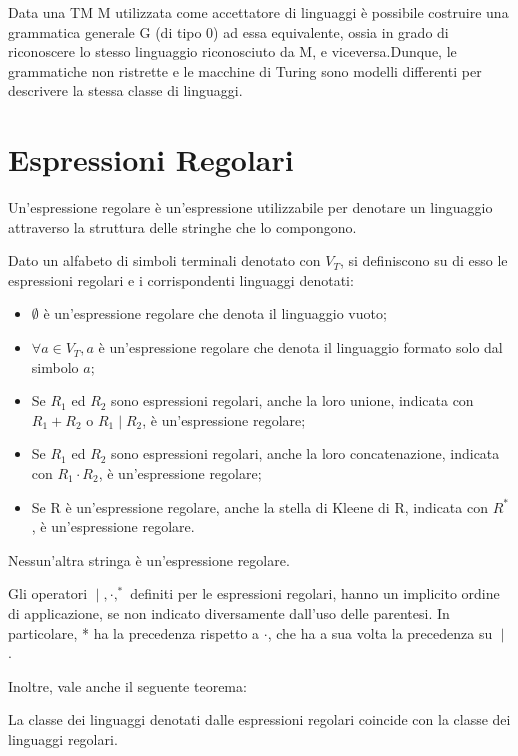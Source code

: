   \begin{theorem}
    Data una TM M utilizzata come accettatore di linguaggi è possibile costruire una grammatica generale G (di tipo 0) ad essa equivalente, ossia in grado di riconoscere lo stesso linguaggio riconosciuto da M, e viceversa.Dunque, le grammatiche non ristrette e le macchine di Turing sono modelli differenti per descrivere la stessa classe di linguaggi.
  \end{theorem}

  \section{Espressioni Regolari}
  Un'espressione regolare è un'espressione utilizzabile per denotare un linguaggio attraverso la struttura delle stringhe che lo compongono.

  \begin{definition}
    Dato un alfabeto di simboli terminali denotato con \(V_T\), si definiscono su di esso le espressioni regolari e i corrispondenti linguaggi denotati:
    \begin{itemize}
      \item \(\emptyset\) è un'espressione regolare che denota il linguaggio vuoto;
      \item \(\forall a\in V_T, a\) è un'espressione regolare che denota il linguaggio formato solo dal simbolo \(a\);
      \item Se \(R_1\) ed \(R_2\) sono espressioni regolari, anche la loro unione, indicata con \(R_1+R_2\) o \(R_1\;|\;R_2\), è un'espressione regolare;
      \item Se \(R_1\) ed \(R_2\) sono espressioni regolari, anche la loro concatenazione, indicata con \(R_1\cdot R_2\), è un'espressione regolare;
      \item Se R è un'espressione regolare, anche la stella di Kleene di R, indicata con \(R^*\), è un'espressione regolare.
    \end{itemize}
  \end{definition}

  Nessun'altra stringa è un'espressione regolare.

  Gli operatori \(\;|\;, \cdot, ^*\) definiti per le espressioni regolari, hanno un implicito ordine di applicazione, se non indicato diversamente dall'uso delle parentesi. In particolare, * ha la precedenza rispetto a \(\cdot\), che ha a sua volta la precedenza su \(\;|\;\).
  
  Inoltre, vale anche il seguente teorema:
  \begin{theorem}
    La classe dei linguaggi denotati dalle espressioni regolari coincide con la classe dei linguaggi regolari. 
  \end{theorem}

